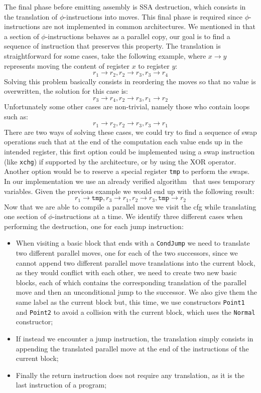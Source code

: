 The final phase before emitting assembly is SSA destruction, which consists in the translation of $\phi$-instructions into moves. This final phase is required since $\phi$-instructions are not implemented in common architectures.
We mentioned in  that a section of $\phi$-instructions behaves as a parallel copy, our goal is to find a sequence of instruction that preserves this property. The translation is straightforward for some cases, take the following example, where $x \to y$ represents moving the content of register $x$ to register $y$:
\[
  r_1 \to r_2, r_2 \to r_3, r_3 \to r_4
\]
Solving this problem basically consists in reordering the moves so that no value is overwritten, the solution for this case is:
\[
  r_3 \to r_4, r_2 \to r_3, r_1 \to r_2
\]
Unfortunately some other cases are non-trivial, namely those who contain loops such as:
\[
  r_1 \to r_2, r_2 \to r_3, r_3 \to r_1
\]
There are two ways of solving these cases, we could try to find a sequence of swap operations such that at the end of the computation each value ends up in the intended register, this first option could be implemented using a swap instruction (like \texttt{xchg}) if supported by the architecture, or by using the XOR operator. Another option would be to reserve a special register \texttt{tmp} to perform the swaps. In our implementation we use an already verified algorithm~\cite{Rideau-Serpette-Leroy-parmov} that uses temporary variables. Given the previous example we would end up with the following result:
\[
  r_1 \to \texttt{tmp}, r_3 \to r_1, r_2 \to r_3, \texttt{tmp} \to r_2
\]
Now that we are able to compile a parallel move we visit the \gls{cfg} while translating one section of $\phi$-instructions at a time.
We identify three different cases when performing the destruction, one for each jump instruction:
\begin{itemize}
  \item When visiting a basic block that ends with a \texttt{CondJump} we need to translate two different parallel moves, one for each of the two successors, since we cannot append two different parallel move translations into the current block, as they would conflict with each other, we need to create two new basic blocks, each of which contains the corresponding translation of the parallel move and then an unconditional jump to the successor. We also give them the same label as the current block but, this time, we use constructors \texttt{Point1} and \texttt{Point2} to avoid a collision with the current block, which uses the \texttt{Normal} constructor;
  \item If instead we encounter a jump instruction, the translation simply consists in appending the translated parallel move at the end of the instructions of the current block;
  \item Finally the return instruction does not require any translation, as it is the last instruction of a program;
\end{itemize}

